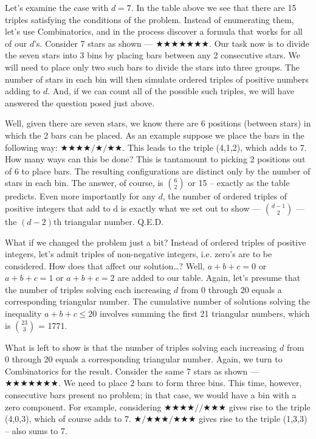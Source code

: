 Let’s examine the case with \(d = 7\). In the table above we see that there are 15 triples satisfying the conditions of the problem. Instead of enumerating them, let’s use Combinatorics, and in the process discover a formula that works for all of our \(d\)’s. Consider 7 stars as shown --- \(\bigstar\bigstar\bigstar\bigstar\bigstar\bigstar\bigstar \). Our task now is to divide the seven stars into 3 bins by placing bars between any 2 consecutive stars. We will need to place only two such bars to divide the stars into three groups. The number of stars in each bin will then simulate ordered triples of positive numbers adding to \(d\). And, if we can count all of the possible such triples, we will have answered the question posed just above.

Well, given there are seven stars, we know there are 6 positions (between stars) in which the 2 bars can be placed. As an example suppose we place the bars in the following way: \(\bigstar\bigstar\bigstar\bigstar/\bigstar/\bigstar\bigstar \). This leads to the triple (4,1,2), which adds to 7. How many ways can this be done? This is tantamount to picking 2 positions out of 6 to place bars. The resulting configurations are distinct only by the number of stars in each bin.  The answer, of course, is \(\binom{6}{2}\) or 15 – exactly as the table predicts. Even more importantly for any \(d\), the number of ordered triples of positive integers that add to d is exactly what we set out to show --- \(\binom{d-1}{2}\) --- the \((d - 2)\)th triangular number. Q.E.D.

What if we changed the problem just a bit? Instead of ordered triples of positive integers, let’s admit triples of non-negative integers, i.e. zero’s are to be considered. How does that affect our solution…? Well, \(a + b + c = 0\) or \(a + b + c = 1\) or \(a + b + c = 2\) are added to our table. Again, let’s presume that the number of triples solving each increasing \(d\) from 0 through 20 equals a corresponding triangular number. The cumulative number of solutions solving the inequality \(a + b + c \leq 20\) involves summing the first 21 triangular numbers, which is \(\binom{23}{3}\) = 1771. 

What is left to show is that the number of triples solving each increasing \(d\) from 0 through 20 equals a corresponding triangular number. Again, we turn to Combinatorics for the result. Consider the same 7 stars as shown --- \(\bigstar\bigstar\bigstar\bigstar\bigstar\bigstar\bigstar \). We need to place 2 bars to form three bins. This time, however, consecutive bars present no problem; in that case, we would have a bin with a zero component. For example, considering \(\bigstar\bigstar\bigstar\bigstar//\bigstar\bigstar\bigstar \) gives rise to the triple (4,0,3), which of course adds to 7. \(\bigstar/\bigstar\bigstar\bigstar/\bigstar\bigstar\bigstar \) gives rise to the triple (1,3,3) – also sums to 7.

